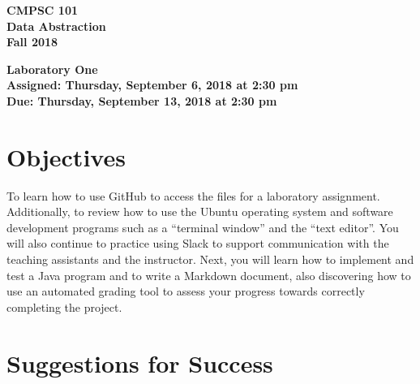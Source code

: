 \documentclass[11pt]{article}
\newcommand{\assignmentduedate}{September 13}
\newcommand{\assignmentassignedate}{September 6}
\newcommand{\assignmentnumber}{One}
\newcommand{\labyear}{2018}
\newcommand{\labday}{Thursday}
\newcommand{\labtime}{2:30 pm}
\newcommand{\assigneddate}{Assigned: \labday, \assignmentassignedate, \labyear{} at \labtime{}}
\newcommand{\duedate}{Due: \labday, \assignmentduedate, \labyear{} at \labtime{}}
\newcommand{\labtitle}[1]
{
  \begin{center}
    \begin{center}
      \bf
      CMPSC 101\\Data Abstraction\\
      Fall 2018\\
      \medskip
    \end{center}
    \bf
    #1
  \end{center}
}
\begin{document}
\thispagestyle{empty}

\labtitle{Laboratory \assignmentnumber{} \\ \assigneddate{} \\ \duedate{}}

\section*{Objectives}

To learn how to use GitHub to access the files for a laboratory assignment.
Additionally, to review how to use the Ubuntu operating system and software
development programs such as a ``terminal window'' and the ``text editor''. You
will also continue to practice using Slack to support communication with the
teaching assistants and the instructor. Next, you will learn how to implement
and test a Java program and to write a Markdown document, also discovering how
to use an automated grading tool to assess your progress towards correctly
completing the project.

\section*{Suggestions for Success}
\end{document}
